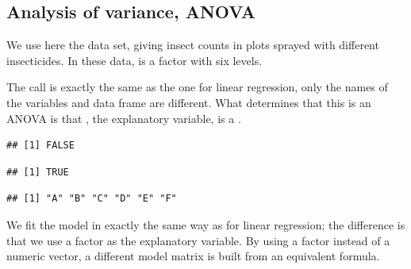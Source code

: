 \documentclass[krantz2]{krantz}\usepackage{knitr}
\begin{document}
\subsection{Analysis of variance, ANOVA}\label{sec:anova}
We use here the  data set, giving insect counts in plots sprayed with different insecticides. In these data,  is a factor with six levels.%
\label{xmpl:fun:lm:fm4}

The call is exactly the same as the one for linear regression, only the names of the variables and data frame are different. What determines that this is an ANOVA is that , the explanatory variable, is a .

\begin{knitrout}\footnotesize
{}\color{fgcolor}\begin{kframe}
\begin{alltt}
\hlopt{$}
\end{alltt}
\begin{verbatim}
## [1] FALSE
\end{verbatim}
\begin{alltt}
\hlopt{$}
\end{alltt}
\begin{verbatim}
## [1] TRUE
\end{verbatim}
\begin{alltt}
\hlopt{$}
\end{alltt}
\begin{verbatim}
## [1] "A" "B" "C" "D" "E" "F"
\end{verbatim}
\end{kframe}
\end{knitrout}

We fit the model in exactly the same way as for linear regression; the difference is that we use a factor as the explanatory variable. By using a factor instead of a numeric vector, a different model matrix is built from an equivalent formula.

\begin{knitrout}\footnotesize
{}\color{fgcolor}\begin{kframe}
\begin{alltt}
 \hlkwb{<-}  \hlopt{~}   
\end{alltt}
\end{kframe}
\end{knitrout}
\end{document}

